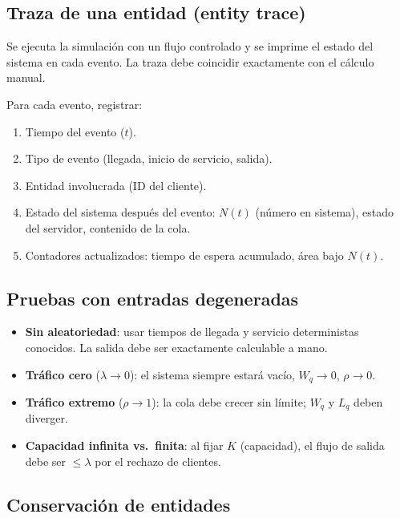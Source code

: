 \documentclass[11pt, letterpaper]{article}
\begin{document}
\subsection{Traza de una entidad (entity trace)}

Se ejecuta la simulación con un flujo controlado y se imprime el estado del sistema en cada evento. La traza debe coincidir exactamente con el cálculo manual.

\begin{metodobox}
Para cada evento, registrar:
\begin{enumerate}
    \item Tiempo del evento ($t$).
    \item Tipo de evento (llegada, inicio de servicio, salida).
    \item Entidad involucrada (ID del cliente).
    \item Estado del sistema después del evento: $N(t)$ (número en sistema), estado del servidor, contenido de la cola.
    \item Contadores actualizados: tiempo de espera acumulado, área bajo $N(t)$.
\end{enumerate}
\end{metodobox}

\subsection{Pruebas con entradas degeneradas}

\begin{itemize}
    \item \textbf{Sin aleatoriedad}: usar tiempos de llegada y servicio deterministas conocidos. La salida debe ser exactamente calculable a mano.
    \item \textbf{Tráfico cero} ($\lambda \to 0$): el sistema siempre estará vacío, $W_q \to 0$, $\rho \to 0$.
    \item \textbf{Tráfico extremo} ($\rho \to 1$): la cola debe crecer sin límite; $W_q$ y $L_q$ deben diverger.
    \item \textbf{Capacidad infinita vs.\ finita}: al fijar $K$ (capacidad), el flujo de salida debe ser $\le\lambda$ por el rechazo de clientes.
\end{itemize}

\subsection{Conservación de entidades}
\end{document}
